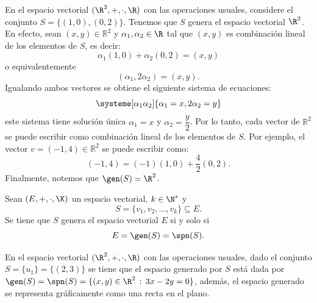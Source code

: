\documentclass[compacto,10pt]{pubciencias-notas}
\begin{document}
\begin{ejem}\label{S07C02:Ej_Conj_gen}
En el espacio vectorial $(\R^2,+,\cdot,\R)$ con las operaciones usuales, considere el conjunto $S=\{(1,0), (0,2)\}$. Tenemos que $S$ genera el espacio vectorial $\R^2$. En efecto, sean $(x,y)\in\mathbb{R}^2$ y $\alpha_1,\alpha_2\in\R$ tal que $(x,y)$ es combinación lineal de los elementos de $S$, es decir:
\[
\alpha_1 (1,0)+\alpha_2 (0,2)=(x,y)
\]
o equivalentemente
\[
(\alpha_1,2\alpha_2)=(x,y).
\]
Igualando ambos vectores se obtiene el siguiente sistema de ecuaciones:
\[
\systeme[\alpha_1 \alpha_2]{\alpha_1=x,2\alpha_2=y}
\]
este sistema tiene solución única $\alpha_1=x$ y $\alpha_2=\dfrac{y}{2}$. Por lo tanto, cada vector de $\mathbb{R}^2$ se puede  escribir como combinación lineal de los elementos de $S$. Por ejemplo, el vector $v=(-1,4)\in\mathbb{R}^2$ se puede escribir como:
\[
    (-1,4)=(-1)(1,0)+\dfrac{4}{2}(0,2).
\]
Finalmente, notemos que $\gen(S) = \R^{2}$.
\end{ejem}


\begin{prop}
    Sean $(E,+,\cdot,\K)$ un espacio vectorial, $k\in\N^{*}$ y 
 \[S=\{v_1,v_2,\ldots,v_k\}\subseteq E.\]
Se tiene que $S$ genera el espacio vectorial $E$ si y solo si
    \[
        E = \gen(S) = \spn(S).
    \]
\end{prop}

\begin{ejem}\label{Semana6: ejem1}
En el espacio vectorial $(\R^{2},+,\cdot,\R)$ con las operaciones usuales, dado el conjunto $S = \{u_{1}\} = \{(2, 3)\}$ se tiene que el espacio generado por $S$ está dada por $\gen(S) = \spn(S) = \{(x,y)\in\R^{2}\,:\,3x-2y=0\}$, además, el espacio generado se representa gráficamente como una recta en el plano.%

\end{ejem}
\end{document}
